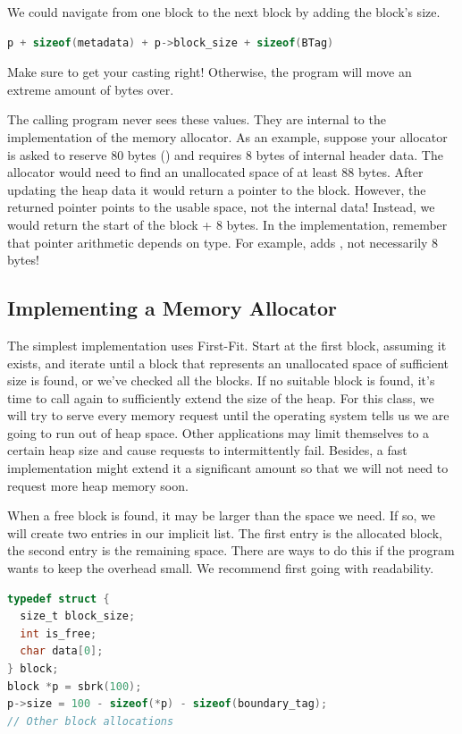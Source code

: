 We could navigate from one block to the next block by adding the block's size.

\begin{lstlisting}[language=C]
p + sizeof(metadata) + p->block_size + sizeof(BTag)
\end{lstlisting}

Make sure to get your casting right!
Otherwise, the program will move an extreme amount of bytes over.

The calling program never sees these values.
They are internal to the implementation of the memory allocator.
As an example, suppose your allocator is asked to reserve 80 bytes () and requires 8 bytes of internal header data.
The allocator would need to find an unallocated space of at least 88 bytes.
After updating the heap data it would return a pointer to the block.
However, the returned pointer points to the usable space, not the internal data!
Instead, we would return the start of the block + 8 bytes.
In the implementation, remember that pointer arithmetic depends on type. For example,  adds , not necessarily 8 bytes!

\subsection{Implementing a Memory Allocator}

The simplest implementation uses First-Fit.
Start at the first block, assuming it exists, and iterate until a block that represents an unallocated space of sufficient size is found, or we've checked all the blocks.
If no suitable block is found, it's time to call  again to sufficiently extend the size of the heap.
For this class, we will try to serve every memory request until the operating system tells us we are going to run out of heap space.
Other applications may limit themselves to a certain heap size and cause requests to intermittently fail.
Besides, a fast implementation might extend it a significant amount so that we will not need to request more heap memory soon.

When a free block is found, it may be larger than the space we need.
If so, we will create two entries in our implicit list.
The first entry is the allocated block, the second entry is the remaining space.
There are ways to do this if the program wants to keep the overhead small.
We recommend first going with readability.

\begin{lstlisting}[language=C]
typedef struct {
  size_t block_size;
  int is_free;
  char data[0];
} block;
block *p = sbrk(100);
p->size = 100 - sizeof(*p) - sizeof(boundary_tag);
// Other block allocations
\end{lstlisting}

